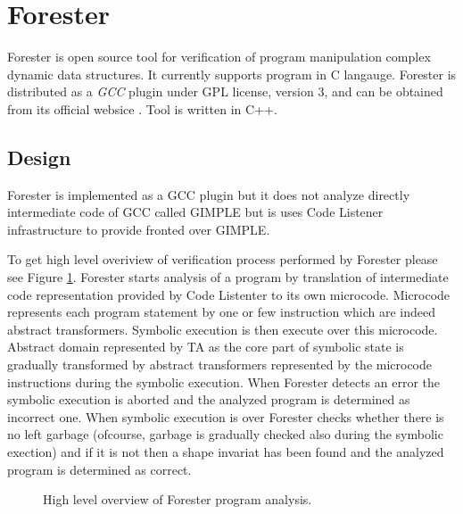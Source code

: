 

\section{Forester}
\label{sec:FA}

Forester is open source tool for verification of program manipulation complex dynamic data structures.
It currently supports program in C langauge.
Forester is distributed as a \emph{GCC} plugin under GPL license, version 3, and can be obtained from its official websice \cite{www.:forester}.
Tool is written in C++.

\subsection{Design}

Forester is implemented as a GCC plugin but it does not analyze directly intermediate code of GCC called GIMPLE but is
uses Code Listener infrastructure \cite{codelistnere} to provide fronted over GIMPLE.

To get high level overiview of verification process performed by Forester please see Figure \ref{fig:fa_exec}. 
Forester starts analysis of a program by translation of intermediate code representation provided by Code Listenter
to its own microcode.
Microcode represents each program statement by one or few instruction which are indeed abstract transformers.
Symbolic execution is then execute over this microcode.
Abstract domain represented by TA as the core part of symbolic state is gradually transformed by abstract transformers
represented by the microcode instructions during the symbolic execution.
When Forester detects an error the symbolic execution is aborted and the analyzed program is determined as incorrect one.
When symbolic execution is over Forester checks whether there is no left garbage (ofcourse, garbage is gradually checked also during the symbolic exection)
and if it is not then a shape invariat has been found and the analyzed program is determined as correct.

\begin{figure}[bt]
	\begin{center}
		
	\end{center}
	\caption{High level overview of Forester program analysis.}
	\label{fig:fa_exec}
\end{figure}


